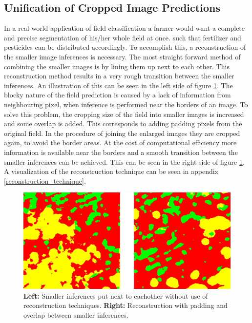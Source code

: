 \documentclass{article}
\begin{document}
\subsection{Unification of Cropped Image Predictions}
In a real-world application of field classification a farmer would want a complete and precise segmentation of his/her whole field at once. such that fertilizer and pesticides can be distributed accordingly. To accomplish this, a reconstruction of the smaller image inferences is necessary. The most straight forward method of combining the smaller images is by lining them up next to each other. This reconstruction method results in a very rough transition between the smaller inferences. An illustration of this can be seen in the left side of figure \ref{fig:earlylatereconstruction}.
The blocky nature of the field prediction is caused by a lack of information from neighbouring pixel, when inference is performed near the borders of an image. 
To solve this problem, the cropping size of the field into smaller images is increased and some overlap is added. This corresponds to adding padding pixels from the original field.
In the procedure of joining the enlarged images they are cropped again, to avoid the border areas. At the cost of computational efficiency more information is available near the borders and a smooth transition between the smaller inferences can be achieved. This can be seen in the right side of figure \ref{fig:earlylatereconstruction}. A visualization of the reconstruction technique can be seen in appendix \ref{reconstruction_technique}.



\begin{figure}[!htb]
	\centering
	\includegraphics[width=0.9\linewidth]{early_late_reconstruction2}
	\caption{\textbf{Left:} Smaller inferences put next to eachother without use of reconstruction techniques. \textbf{Right:} Reconstruction with padding and overlap between smaller inferences.}
	\label{fig:earlylatereconstruction}
\end{figure}
\end{document}
